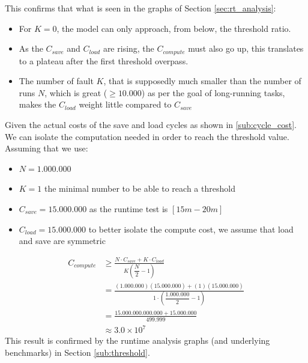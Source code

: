 \documentclass[11pt,a4paper]{report}
\begin{document}
This confirms that what is seen in the graphs of Section \ref{sec:rt_analysis}:
\begin{itemize}
    \item For $K{=}0$, the model can only approach, from below, the threshold ratio.
    \item As the $C_{save}$ and $C_{load}$ are rising, the $C_{compute}$ must also go up, this translates to a plateau after the first threshold overpass.
    \item The number of fault $K$, that is supposedly much smaller than the number of runs $N$, which is great ($\ge 10.000$) as per the goal of long-running tasks, makes the $C_{load}$ weight little compared to $C_{save}$
\end{itemize}
Given the actual costs of the save and load cycles as shown in \ref{sub:cycle_cost}.
We can isolate the computation needed in order to reach the threshold value.
\\
Assuming that we use:
\begin{itemize}
    \item $N{=}1.000.000$
    \item $K{=}1$ the minimal number to be able to reach a threshold
    \item $C_{save}{=}15.000.000$ as the runtime test is $[15m-20m]$
    \item $C_{load}{=}15.000.000$ to better isolate the compute cost, we assume that load and save are symmetric
\end{itemize} 
\begin{align}
C_{compute}
&\ge \frac{N\cdot C_{save} + K\cdot C_{load}}{K\left(\dfrac{N}{2}-1\right)} \\[6pt]
&= \frac{(1.000.000)(15.000.000) + (1)(15.000.000)}{1\cdot\left(\dfrac{1.000.000}{2}-1\right)} \\[6pt]
&= \frac{15.000.000.000.000 + 15.000.000}{499.999} \\[6pt]
&\approx 3.0 \times 10^{7}
\end{align}
This result is confirmed by the runtime analysis graphs (and underlying benchmarks) in Section \ref{sub:threshold}.
\end{document}
